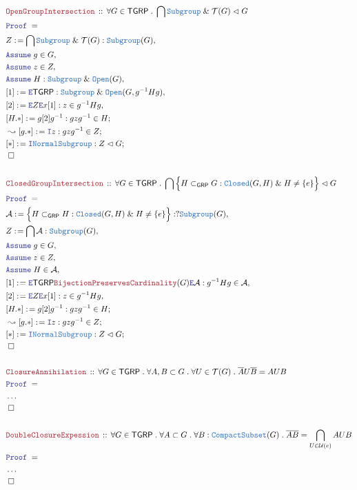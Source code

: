 \documentclass[12pt]{scrartcl}
\newcommand{\TYPE}[1]{\textcolor{NavyBlue}{\mathtt{#1}}}
\newcommand{\LOGIC}[1]{\textcolor{Blue}{\mathtt{#1}}}
\newcommand{\THM}[1]{\textcolor{Maroon}{\mathtt{#1}}}
\renewcommand{\.}{\; . \;}
\newcommand{\de}{: \kern 0.1pc =}
\newcommand{\Theorem}[2]{& \THM{#1} \, :: \, #2 \\ & \Proof = \\ }
\newcommand{\Page}[1]{ \begin{align*} #1 \end{align*}   }
\newcommand{\NoProof}{ & \ldots \\ \EndProof}
\renewcommand{\And}{\; \& \;}
\newcommand{\Say}[3]{& #1 \de #2 : #3, \\}
\newcommand{\Conclude}[3]{& #1 \de #2 : #3; \\}
\newcommand{\DeriveConclude}[3]{& \leadsto #1 \de #2 : #3 ; \\}
\newcommand{\Assume}[2]{& \LOGIC{Assume} \; #1 : #2, \\}
\newcommand{\AssumeIn}[2]{& \LOGIC{Assume} \; #1 \in #2, \\}
\newcommand{\Intro}{\LOGIC{I}}
\newcommand{\Elim}{\LOGIC{E}}
\newcommand{\QED}{\; \square}
\newcommand{\EndProof}{& \QED \\}
\newcommand{\Proof}{\LOGIC{Proof} \; }
\newcommand{\A}{\mathcal{A}}
\newcommand{\Open}{\TYPE{Open}}
\newcommand{\Closed}{\TYPE{Closed}}
\newcommand{\Compacts}{\TYPE{CompactSubset}}
\newcommand{\T}{\mathcal{T}}
\renewcommand{\U}{\mathcal{U}}
\newcommand{\Sgrp}{\subset_{\mathsf{GRP}}}
\newcommand{\Nrml}{\vartriangleleft}
\newcommand{\TGRP}{\mathsf{TGRP}}
\begin{document}
\Page{
	\Theorem{OpenGroupIntersection}
	{
		\forall G \in \TGRP \.
		\bigcap \TYPE{Subgroup} \And \T(G) \Nrml G
	}
	\Say{Z}{\bigcap \TYPE{Subgroup} \And \T(G)}{\TYPE{Subgroup}(G)}
	\AssumeIn{g}{G}
	\AssumeIn{z}{Z}
	\Assume{H}{\TYPE{Subgroup} \And \Open(G)}
	\Say{[1]}{\Elim \TGRP}{\TYPE{Subgroup} \And \Open(G,g^{-1}Hg)}
	\Say{[2]}{\Elim Z \Elim x [1]}{z \in g^{-1}Hg}
	\Conclude{[H.*]}{g[2]g^{-1}}{gzg^{-1} \in H}
	\DeriveConclude{[g.*]}{\Intro z}{gzg^{-1} \in Z}
	\Conclude{[*]}{\Intro \TYPE{NormalSubgroup}}{Z \Nrml G}
	\EndProof
	\\
	\Theorem{ClosedGroupIntersection}
	{
		\forall G \in \TGRP \.
		\bigcap \Big\{ H \Sgrp G : \Closed(G,H) \And H \neq \{e\} \Big\}
		\Nrml
		G
	}
	\Say{\A}{
		\Big\{ H \Sgrp H : \Closed(G,H) \And H \neq \{e\} \Big\}	
	}{?\TYPE{Subgroup}(G)}
	\Say{Z}{\bigcap \A}{\TYPE{Subgroup}(G)}
	\AssumeIn{g}{G}
	\AssumeIn{z}{Z}
	\AssumeIn{H}{\A}
	\Say{[1]}{\Elim \TGRP \THM{BijectionPreservesCardinality}(G)\Elim \A}
	{ g^{-1}Hg \in \A   }
	\Say{[2]}{\Elim Z \Elim x [1]}{z \in g^{-1}Hg}
	\Conclude{[H.*]}{g[2]g^{-1}}{gzg^{-1} \in H}
	\DeriveConclude{[g.*]}{\Intro z}{gzg^{-1} \in Z}
	\Conclude{[*]}{\Intro \TYPE{NormalSubgroup}}{Z \Nrml G}
	\EndProof
	\\
	\Theorem{ClosureAnnihilation}
	{
		\forall G \in \TGRP \.
		\forall A,B \subset G \.
		\forall U \in \T(G) \.
		\overline{A}U\overline{B} = AUB
 	}
 	\NoProof
 	\\
 	\Theorem{DoubleClosureExpession}
 	{
 		\forall G \in \TGRP \.
 		\forall A \subset G \.
 		\forall B : \Compacts(G) \.
 		\overline{AB} = \bigcap_{U \in \U(e)} AUB
 	}
 	\NoProof
}
\newpage
\end{document}
